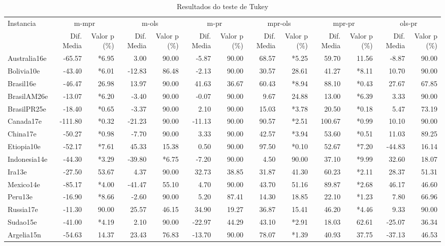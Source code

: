 \begin{landscape}
\begin{table}[htb]

\caption{Resultados do teste de Tukey}
\label{tab:resultados_tukey}
\begin{tabular}{@{}l|rr|rr|rr|rr|rr|rr@{}}
\toprule
Instancia&\multicolumn{2}{|c|}{m-mpr}&\multicolumn{2}{|c|}{m-ols}&\multicolumn{2}{|c|}{m-pr}&\multicolumn{2}{|c|}{mpr-ols}&\multicolumn{2}{|c|}{mpr-pr}&\multicolumn{2}{|c|}{ols-pr}\\
&Dif. Media&Valor p (\%)&Dif. Media&Valor p (\%)&Dif. Media&Valor p (\%)&Dif. Media&Valor p (\%)&Dif. Media&Valor p (\%)&Dif. Media&Valor p (\%)\\\midrule
Australia16e&-65.57&*6.95&3.00&90.00&-5.87&90.00&68.57&*5.25&59.70&11.56&-8.87&90.00\\
Bolivia10e&-43.40&*6.01&-12.83&86.48&-2.13&90.00&30.57&28.61&41.27&*8.11&10.70&90.00\\
Brasil16e&-46.47&26.98&13.97&90.00&41.63&36.67&60.43&*8.94&88.10&*0.43&27.67&67.85\\
BrasilAM26e&-13.07&*6.20&-3.40&90.00&-0.07&90.00&9.67&24.88&13.00&*6.39&3.33&90.00\\
BrasilPR25e&-18.40&*0.65&-3.37&90.00&2.10&90.00&15.03&*3.78&20.50&*0.18&5.47&73.19\\
Canada17e&-111.80&*0.32&-21.23&90.00&-11.13&90.00&90.57&*2.51&100.67&*0.99&10.10&90.00\\
China17e&-50.27&*0.98&-7.70&90.00&3.33&90.00&42.57&*3.94&53.60&*0.51&11.03&89.25\\
Etiopia10e&-52.17&*7.61&45.33&15.38&0.50&90.00&97.50&*0.10&52.67&*7.20&-44.83&16.14\\
Indonesia14e&-44.30&*3.29&-39.80&*6.75&-7.20&90.00&4.50&90.00&37.10&*9.99&32.60&18.07\\
Ira13e&-27.50&53.67&4.37&90.00&32.73&38.85&31.87&41.30&60.23&*2.11&28.37&51.31\\
Mexico14e&-85.17&*4.00&-41.47&55.10&4.70&90.00&43.70&51.16&89.87&*2.68&46.17&46.60\\
Peru13e&-16.90&*8.66&-2.60&90.00&5.20&87.41&14.30&18.85&22.10&*1.23&7.80&66.96\\
Russia17e&-11.30&90.00&25.57&46.15&34.90&19.27&36.87&15.41&46.20&*4.46&9.33&90.00\\
Sudao15e&-41.00&*4.19&2.10&90.00&-22.97&44.29&43.10&*2.91&18.03&62.61&-25.07&36.34\\
Argelia15n&-54.63&14.37&23.43&76.83&-13.70&90.00&78.07&*1.39&40.93&37.75&-37.13&46.53\\

\end{tabular}
\end{table}
\end{landscape}
